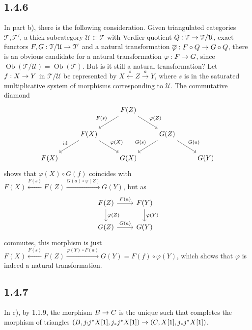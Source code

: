 \documentclass[deligne.tex]{subfiles}
\begin{document}
	\subsection*{1.4.6} In part b), there is the following consideration.
	Given triangulated categories $\mathcal T,\mathcal T'$, a thick 
	subcategory $\mathcal U\subset\mathcal T$ with Verdier quotient	$Q:\mathcal T\rightarrow\mathcal T/\mathcal U$, exact
	functors $F,G:\mathcal T/\mathcal U\rightarrow\mathcal T'$ and a natural 
	transformation $\overline\varphi:F\circ Q\rightarrow G\circ Q$, there is an 
	obvious candidate for a natural transformation $\varphi:F\rightarrow G$, since
	$\operatorname{Ob}(\mathcal T/\mathcal U)=\operatorname{Ob}(\mathcal T)$.
	But is it still a natural transformation? Let $f:X\rightarrow Y$ in
	$\mathcal T/\mathcal U$ be represented by $X\xleftarrow{s}Z\xrightarrow{a}Y$,
	where $s$ is in the saturated multiplicative system of morphisms 
	corresponding to $\mathcal U$. The commutative diamond
	\begin{equation*}
	\begin{tikzcd}
		&&F(Z)\arrow[dl,swap,"F(s)"]\arrow[dr,"\varphi(Z)"] \\
		&F(X)\arrow[dl,swap,"\id"]\arrow[dr,"\varphi(X)"]&&
		G(Z)\arrow[dl,swap,"G(s)"]\arrow[dr,"G(a)"]\\
		F(X)&&G(X)&&G(Y)
	\end{tikzcd}
	\end{equation*}
	shows that $\varphi(X)\circ G(f)$ coincides with
	$F(X)\xleftarrow{F(s)}F(Z)\xrightarrow{G(a)\circ\varphi(Z)}G(Y)$, but as
	\begin{equation*}
	\begin{tikzcd}
		F(Z)\arrow[r,"F(a)"]\arrow[d,"\varphi(Z)"]
		&F(Y)\arrow[d,"\varphi(Y)"] \\
		G(Z)\arrow[r,"G(a)"]
		&G(Y)
	\end{tikzcd}
	\end{equation*}
	commutes, this morphism is just
	$F(X)\xleftarrow{F(s)}F(Z)\xrightarrow{\varphi(Y)\circ F(a)}G(Y)=F(f)\circ\varphi(Y)$, which shows that $\varphi$ is indeed a natural 
	transformation.
	
	\subsection*{1.4.7} In c), by 1.1.9, the morphism $B\rightarrow C$ is the unique such
	that completes the morphism of triangles
	$(B,j_!j^*X[1],j_*j^*X[1])\rightarrow(C,X[1],j_*j^*X[1])$.
	
\end{document}
